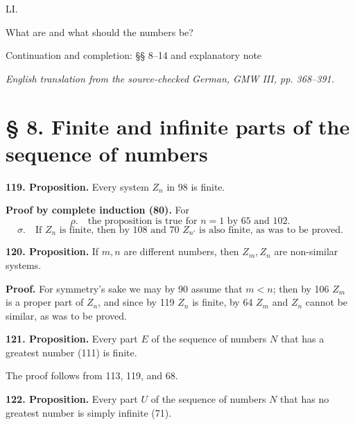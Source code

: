 \documentclass[11pt]{article}
\begin{document}
\begin{center}
{\Large LI.}\par\vspace{0.4em}
{\LARGE What are and what should the numbers be?}\par
{\large Continuation and completion: §§ 8--14 and explanatory note}\par\vspace{0.6em}
{\itshape English translation from the source-checked German, GMW III, pp. 368--391.}
\end{center}
\section*{§ 8. Finite and infinite parts of the sequence of numbers}

\noindent\textbf{119. Proposition.} Every system $Z_n$ in 98 is finite.

\noindent\textbf{Proof by complete induction (80).} For
\[
\rho.\quad \text{the proposition is true for }n=1\text{ by 65 and 102.}
\]
\[
\sigma.\quad \text{If }Z_n\text{ is finite, then by 108 and 70 }Z_{n'}\text{ is also finite, as was to be proved.}
\]

\noindent\textbf{120. Proposition.} If $m,n$ are different numbers, then $Z_m,Z_n$ are non-similar systems.

\noindent\textbf{Proof.} For symmetry's sake we may by 90 assume that $m<n$; then by 106 $Z_m$ is a proper part of $Z_n$, and since by 119 $Z_n$ is finite, by 64 $Z_m$ and $Z_n$ cannot be similar, as was to be proved.

\noindent\textbf{121. Proposition.} Every part $E$ of the sequence of numbers $N$ that has a greatest number (111) is finite.

The proof follows from 113, 119, and 68.

\noindent\textbf{122. Proposition.} Every part $U$ of the sequence of numbers $N$ that has no greatest number is simply infinite (71).
\end{document}
